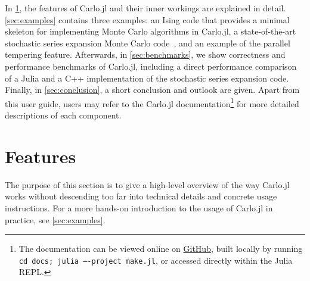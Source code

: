\documentclass{SciPost}
\begin{document}
In \cref{sec:features}, the features of Carlo.jl and their inner workings are explained in detail. \cref{sec:examples} contains three examples: an Ising code that provides a minimal skeleton for implementing Monte Carlo algorithms in Carlo.jl, a state-of-the-art stochastic series expansion Monte Carlo code~\cite{Sandvik1999}, and an example of the parallel tempering feature. Afterwards, in \cref{sec:benchmarks}, we show correctness and performance benchmarks of Carlo.jl, including a direct performance comparison of a Julia and a C++ implementation of the stochastic series expansion code. Finally, in \cref{sec:conclusion}, a short conclusion and outlook are given.
Apart from this user guide, users may refer to the Carlo.jl documentation\footnote{The documentation can be viewed online on \href{https://github.com/lukas-weber/Carlo.jl.git}{GitHub}, built locally by running  \texttt{cd docs; julia ----project make.jl}, or accessed directly within the Julia REPL.} for more detailed descriptions of each component.

\section{Features}
\label{sec:features}
The purpose of this section is to give a high-level overview of the way Carlo.jl works without descending too far into technical details and concrete usage instructions. For a more hands-on introduction to the usage of Carlo.jl in practice, see \cref{sec:examples}.
\end{document}
